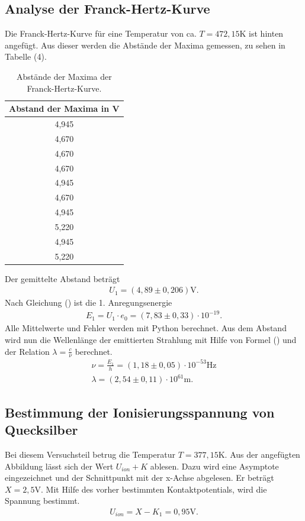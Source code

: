 \subsection{Analyse der Franck-Hertz-Kurve}
Die Franck-Hertz-Kurve für eine Temperatur von ca. $T=472,15 \si{\K}$ ist hinten angefügt.
Aus dieser werden die Abstände der Maxima gemessen, zu sehen in Tabelle (4).

\begin{table}[H]
  \centering
  \caption{Abstände der Maxima der Franck-Hertz-Kurve.}
  \label{tab:Parameter}
  \begin{tabular}{c }
    \toprule
     Abstand der Maxima in V \\
    \bottomrule
     4,945\\
     4,670\\
     4,670\\
     4,670\\
     4,945\\
    4,670\\
    4,945\\
    5,220\\
     4,945\\
    5,220\\
   \bottomrule
  \end{tabular}
\end{table}

Der gemittelte Abstand beträgt
\begin{align}
U_1 = (4,89 \pm 0,206) \si{\V}.
\end{align}
Nach Gleichung () ist die 1. Anregungsenergie
\begin{align}
E_1 = U_1 \cdot e_0 = (7,83 \pm 0,33)\cdot 10^{-19} .
\end{align}
Alle Mittelwerte und Fehler werden mit Python berechnet.
Aus dem Abstand wird nun die Wellenlänge der emittierten Strahlung mit Hilfe von Formel () und der Relation $\lambda = \frac{c}{\nu} $ berechnet.
\begin{align}
\nu = \frac{E_1}{h} = (1,18 \pm 0,05)\cdot 10^{-53} \si{\Hz}\\
\lambda = (2,54 \pm 0,11)\cdot 10^{61} \si{\m}.
\end{align}


\subsection{Bestimmung der Ionisierungsspannung von Quecksilber}
Bei diesem Versuchsteil betrug die Temperatur $T= 377,15\si{\K}$.
Aus der angefügten Abbildung lässt sich der Wert $U_{ion}+K$ ablesen.
Dazu wird eine Asymptote eingezeichnet und der Schnittpunkt mit der x-Achse abgelesen.
Er beträgt $X = 2,5 \si{\V}$. Mit Hilfe des vorher bestimmten Kontaktpotentials, wird die Spannung bestimmt.
\begin{align}
U_{ion} = X-K_1 = 0,95\si{\V}.
\end{align}